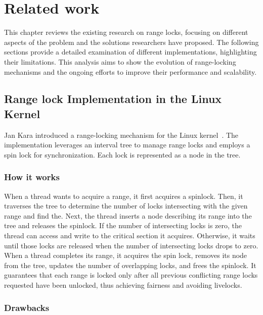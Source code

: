 
\chapter{Related work}\label{chapter:relatedwork}

This chapter reviews the existing research on range locks, focusing on different aspects of the problem and the solutions researchers have proposed. The following sections provide a detailed examination of different implementations, highlighting their limitations. This analysis aims to show the evolution of range-locking mechanisms and the ongoing efforts to improve their performance and scalability.

\section{Range lock Implementation in the Linux Kernel}

Jan Kara introduced a range-locking mechanism for the Linux kernel~\parencite{linuxRangeLockImpl2013}. The implementation leverages an interval tree to manage range locks and employs a spin lock for synchronization. Each lock is represented as a node in the tree.

\subsection*{How it works}

When a thread wants to acquire a range, it first acquires a spinlock. Then, it traverses the tree to determine the number of locks intersecting with the given range and find the. Next, the thread inserts a node describing its range into the tree and releases the spinlock. If the number of intersecting locks is zero, the thread can access and write to the critical section it acquires. Otherwise, it waits until those locks are released when the number of intersecting locks drops to zero. When a thread completes its range, it acquires the spin lock, removes its node from the tree, updates the number of overlapping locks, and frees the spinlock. It guarantees that each range is locked only after all previous conflicting range locks requested have been unlocked, thus achieving fairness and avoiding livelocks.
    
\subsection*{Drawbacks}

